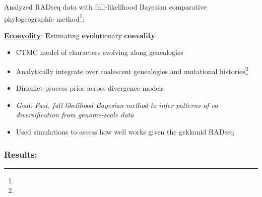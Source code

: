 % 
\begin{frame}

    Analyzed RADseq data with full-likelihood Bayesian comparative phylogeographic method\footnote{\tiny{}}:

    \begin{center}
        \LARGE
        \href{https://github.com/phyletica/ecoevolity}{
            \textbf{\textcolor{pgreen}{E}\textcolor{pteal}{co\textcolor{pauburn}{evo}lity}}}:
        \textcolor{pgreen}{\bf E}stimating \textcolor{pauburn}{\bf evo}lutionary \textcolor{pteal}{\bf coevality}
    \end{center}

    \begin{itemize}
        \item<2-> CTMC model of characters evolving along genealogies
        \item<2-> Analytically integrate over coalescent genealogies and
            mutational histories\footnote{\tiny{}}
        \item<2-> Dirichlet-process prior across divergence models

        \bigskip
        \item<3-> \textsl{Goal: Fast, full-likelihood Bayesian method to infer
                patterns of co-diversification from genome-scale data}
        \item<4-> Used simulations to assess how well \ecoevolity works given
            the gekkonid RADseq \datasets
    \end{itemize}
\end{frame}

% 
% 
\begin{frame}
    \frametitle{Results: }

    \begin{center}
        \centerline{
        }

        \smallskip
    \end{center}

\end{frame}

